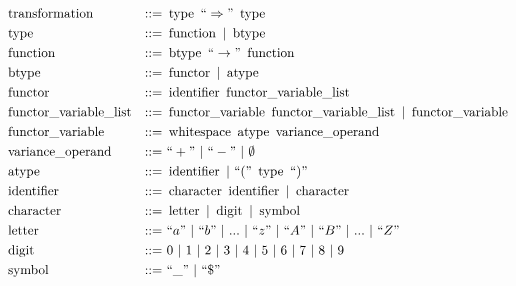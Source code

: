 \documentclass[../../Dissertation.tex]{subfiles}
\begin{document}
\begin{align*}
  &\transformterminal &::=&\ \typeterminal\ ``\Rightarrow"\ \typeterminal\\
  &\typeterminal &::=&\ \functionterminal\ |\ \btypeterminal\\
  &\functionterminal &::=&\ \btypeterminal\ ``\rightarrow"\ \functionterminal\\
  &\btypeterminal &::=&\ \functorterminal\ |\ \atypeterminal\\
  &\functorterminal &::=&\ \identifierterminal\ \variablelistterminal\\
  &\variablelistterminal &::=&\ \variableterminal\ \variablelistterminal\ |\ \variableterminal\\
  &\variableterminal &::=&\ \whitespaceterminal\ \atypeterminal\ \varianceterminal\\
  &\varianceterminal &::=&\ ``+"\ |\ ``-"\ |\ \emptyset\\
  &\atypeterminal &::=&\ \identifierterminal\ |\ ``("\ \typeterminal\ ``)"\\
  &\identifierterminal &::=&\ \characterterminal\ \identifierterminal\ |\ \characterterminal\\
  &\characterterminal &::=&\ \letterterminal\ |\ \digitterminal\ |\ \symbolterminal\\
  &\letterterminal &::=&\ ``a"\ |\ ``b"\ |\ ...\ |\ ``z"\ |\ ``A"\ |\ ``B"\ |\ ...\ |\ ``Z"\\
  &\digitterminal &::=&\ 0\ |\ 1\ |\ 2\ |\ 3\ |\ 4\ |\ 5\ |\ 6\ |\ 7\ |\ 8\ |\ 9\\
  &\symbolterminal &::=&\ ``\_"\ |\ ``\$"
\end{align*}
\end{document}
